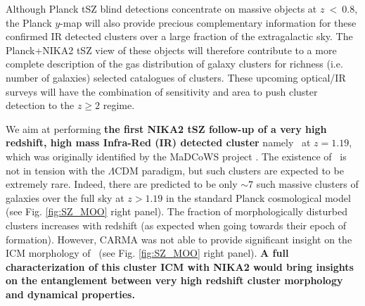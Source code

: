 \documentclass[11pt,a4paper,twoside,graphicx,color]{article}
\begin{document}
\noindent Although Planck tSZ blind detections concentrate on massive objects at $z~<~$0.8, the Planck $y$-map will also provide precious complementary information for these confirmed IR detected clusters over a large fraction of the extragalactic sky. The Planck+NIKA2 tSZ view of these objects will therefore contribute to a more complete description of the gas distribution of galaxy clusters for richness (i.e. number of galaxies) selected catalogues of clusters.  These upcoming optical/IR surveys will have the combination of sensitivity and area to push cluster detection to the $z \geq 2$ regime.

We aim at performing \textbf{the first NIKA2 tSZ follow-up of a very high redshift, high mass Infra-Red (IR) detected cluster} namely \moo\ at $z = 1.19$, which was originally identified by the MaDCoWS project \cite{gon15}. The existence of \moo\ is not in tension with the $\Lambda$CDM paradigm, but such clusters are expected to be extremely rare. Indeed, there are predicted to be only $\sim 7$ such massive clusters of galaxies over the full sky at $z >1.19$ in the standard Planck cosmological model (see Fig. \ref{fig:SZ_MOO} right panel). The fraction of morphologically disturbed clusters increases with redshift (as expected when going towards their epoch of formation). However, CARMA was not able to provide significant insight on the ICM morphology of \moo\ (see Fig. \ref{fig:SZ_MOO} right panel).
\textbf{A full characterization of this cluster ICM with NIKA2 would bring insights on the entanglement between very high redshift cluster morphology and dynamical properties.}
\end{document}
